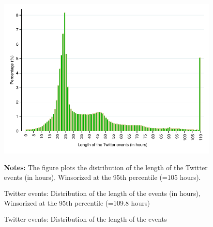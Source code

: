 \clearpage
\pagebreak
\begin{figure}
\begin{center}
\includegraphics[scale=1]{figures/distribution_length_Tevents}
\end{center}
	\begin{spacing}{0.5}
		{\footnotesize \textbf{Notes:} The figure plots the distribution of the length of the Twitter events (in hours), Winsorized at the 95th percentile (=105 hours). }
	\end{spacing}
\vspace{.5cm}	
	\caption{Twitter events: Distribution of the length of the events}{ Twitter events: Distribution of the length of the events (in hours),
Winsorized at the 95th percentile (=109.8 hours)}
	\label{fig:distribution_length_Tevents}
\end{figure}


